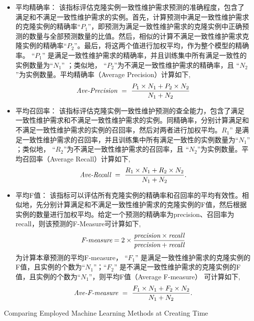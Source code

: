 \begin{itemize}
\item
平均精确率：
 该指标评估克隆实例一致性维护需求预测的准确程度，包含了满足和不满足一致性维护需求的实例。首先，计算预测中满足一致性维护需求的克隆实例的精确率``$P_1$''，即预测为满足一致性维护需求的克隆实例中正确预测的数量与全部预测数量的比值。然后，相似的计算不满足一致性维护需求克隆实例的精确率``$P_2$''。最后，将这两个值进行加权平均，作为整个模型的精确率。 ``$P_1$'' 是满足一致性维护需求的精确率，并且训练集中所有满足一致性的实例数量为``$N_1$'' ；类似地， ``$P_2$''为不满足一致性维护需求的精确率，且 ``$N_2$''为实例数量。平均精确率（Average Precision）计算如下,
\[
\mbox{\it Ave-Precision} ~=~ {\frac {P_1 \times N_1 + P_2 \times N_2}{N_1 + N_2}}
\]

\item
平均召回率：
该指标评估克隆实例一致性维护预测的查全能力，包含了满足一致性维护需求和不满足一致性维护需求的实例。同精确率，分别计算满足和不满足一致性维护需求的实例的召回率，然后对两者进行加权平均。$R_1$'' 是满足一致性维护需求的召回率，并且训练集中所有满足一致性的实例数量为``$N_1$'' ；类似地， ``$R_2$''为不满足一致性维护需求的召回率，且 ``$N_2$''为实例数量。平均召回率（Average Recall）计算如下,
\[
\mbox{\it Ave-Recall} ~=~ {\frac  {R_1 \times N_1 + R_2 \times N_2}{N_1 + N_2}}.
\]

\item
平均F值：
该指标可以评估所有克隆实例的精确率和召回率的平均有效性。相似地，先分别计算满足和不满足一致性维护需求的克隆实例的F值，然后根据实例的数量进行加权平均。给定一个预测的精确率为precision、召回率为 recall，则该预测的F-Measure可计算如下,
\[  
\mbox{\it F-measure} =2 \times {\frac {\mbox{\it precision} \times \mbox{\it recall} }{ \mbox{\it precision} + \mbox{\it recall} } }
\]
为计算本章预测的平均F-measure， ``$F_1$'' 是满足一致性维护需求的克隆实例的F值，且实例的个数为``$N_1$''；``$F_2$'' 是不满足一致性维护需求的克隆实例的F值，且实例的个数为``$N_1$''，则平均F值（Average F-measure） 可计算如下,
\[
\mbox{\it Ave-F-measure} ~=~ {\frac  {F_1 \times N_1 + F_2 \times N_2}{N_1 + N_2}}.
\]
\end{itemize}


{Comparing Employed Machine Learning Methods at Creating Time}

